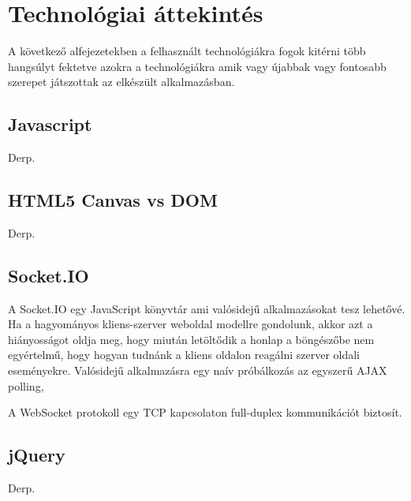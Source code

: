 \chapter{Technológiai áttekintés}
A következő alfejezetekben a felhasznált technológiákra fogok kitérni több hangsúlyt fektetve azokra a technológiákra amik vagy újabbak vagy fontosabb szerepet játszottak az elkészült alkalmazásban.


\section{Javascript}
Derp.

\section{HTML5 Canvas vs DOM}
Derp.

\section{Socket.IO}
A Socket.IO egy JavaScript könyvtár ami valósidejű alkalmazásokat tesz lehetővé. Ha a hagyományos kliens-szerver weboldal modellre gondolunk, akkor azt a hiányosságot oldja meg, hogy miután letöltődik a honlap a böngészőbe nem egyértelmű, hogy hogyan tudnánk a kliens oldalon reagálni szerver oldali eseményekre. 
Valósidejű alkalmazásra egy naív próbálkozás az egyszerű AJAX polling,  

A WebSocket protokoll egy TCP kapcsolaton full-duplex kommunikációt biztosít.


\section{jQuery}
Derp.

